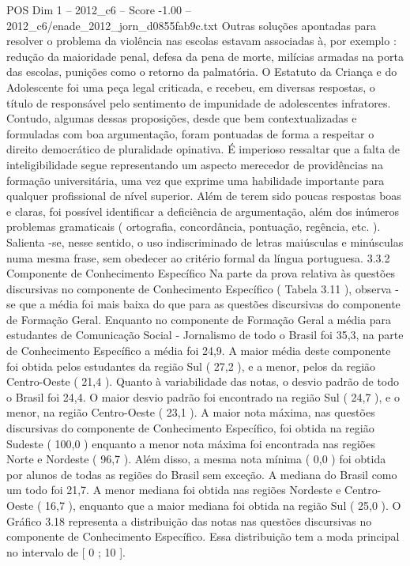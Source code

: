 \begin{textsample}{POS Dim 1 – 2012\_c6 – Score -1.00 – 2012\_c6/enade\_2012\_jorn\_d0855fab9c.txt}
Outras soluções apontadas para resolver o problema da violência nas escolas estavam associadas à, por exemplo : redução da maioridade penal, defesa da pena de morte, milícias armadas na porta das escolas, punições como o retorno da palmatória.
O Estatuto da Criança e do Adolescente foi uma peça legal criticada, e recebeu, em diversas respostas, o título de responsável pelo sentimento de impunidade de adolescentes infratores.
Contudo, algumas dessas proposições, desde que bem contextualizadas e formuladas com boa argumentação, foram pontuadas de forma a respeitar o direito democrático de pluralidade opinativa.
É imperioso ressaltar que a falta de inteligibilidade segue representando um aspecto merecedor de providências na formação universitária, uma vez que exprime uma habilidade importante para qualquer profissional de nível superior.
Além de terem sido poucas respostas boas e claras, foi possível identificar a deficiência de argumentação, além dos inúmeros problemas gramaticais ( ortografia, concordância, pontuação, regência, etc. ).
Salienta -se, nesse sentido, o uso indiscriminado de letras maiúsculas e minúsculas numa mesma frase, sem obedecer ao critério formal da língua portuguesa. 3.3.2 Componente de Conhecimento Específico Na parte da prova relativa às questões discursivas no componente de Conhecimento Específico ( Tabela 3.11 ), observa -se que a média foi mais baixa do que para as questões discursivas do componente de Formação Geral.
Enquanto no componente de Formação Geral a média para estudantes de Comunicação Social - Jornalismo de todo o Brasil foi 35,3, na parte de Conhecimento Específico a média foi 24,9.
A maior média deste componente foi obtida pelos estudantes da região Sul ( 27,2 ), e a menor, pelos da região Centro-Oeste ( 21,4 ).
Quanto à variabilidade das notas, o desvio padrão de todo o Brasil foi 24,4.
O maior desvio padrão foi encontrado na região Sul ( 24,7 ), e o menor, na região Centro-Oeste ( 23,1 ).
A maior nota máxima, nas questões discursivas do componente de Conhecimento Específico, foi obtida na região Sudeste ( 100,0 ) enquanto a menor nota máxima foi encontrada nas regiões Norte e Nordeste ( 96,7 ).
Além disso, a mesma nota mínima ( 0,0 ) foi obtida por alunos de todas as regiões do Brasil sem exceção.
A mediana do Brasil como um todo foi 21,7.
A menor mediana foi obtida nas regiões Nordeste e Centro-Oeste ( 16,7 ), enquanto que a maior mediana foi obtida na região Sul ( 25,0 ).
O Gráfico 3.18 representa a distribuição das notas nas questões discursivas no componente de Conhecimento Específico.
Essa distribuição tem a moda principal no intervalo de [ 0 ; 10 ].

\end{textsample}
